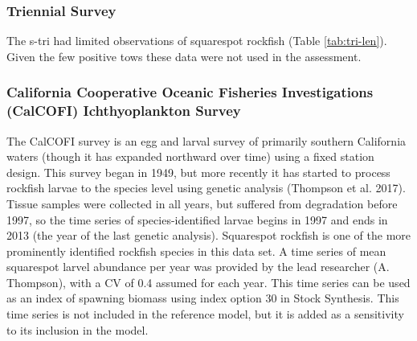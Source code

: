 \documentclass[11pt,
  english,
  a4paper,
]{article}
\begin{document}
\leavevmode\tagmcend\tagstructend\par


\hypertarget{triennial-survey}{%
\subsubsection{Triennial Survey}\label{triennial-survey}}

\leavevmode\tagmcend\tagstructend


The \gls{s-tri} had limited observations of squarespot rockfish (Table \ref{tab:tri-len}). Given the few positive tows these data were not used in the assessment.

\leavevmode\tagmcend\tagstructend\par


\hypertarget{california-cooperative-oceanic-fisheries-investigations-calcofi-ichthyoplankton-survey}{%
\subsubsection{California Cooperative Oceanic Fisheries Investigations (CalCOFI) Ichthyoplankton Survey}\label{california-cooperative-oceanic-fisheries-investigations-calcofi-ichthyoplankton-survey}}

\leavevmode\tagmcend\tagstructend


The CalCOFI survey is an egg and larval survey of primarily southern California waters (though it has expanded northward over time) using a fixed station design. This survey began in 1949, but more recently it has started to process rockfish larvae to the species level using genetic analysis {(Thompson et al. 2017)\leavevmode\tagmcend\tagstructend}. Tissue samples were collected in all years, but suffered from degradation before 1997, so the time series of species-identified larvae begins in 1997 and ends in 2013 (the year of the last genetic analysis). Squarespot rockfish is one of the more prominently identified rockfish species in this data set. A time series of mean squarespot larvel abundance per year was provided by the lead researcher (A. Thompson), with a CV of 0.4 assumed for each year. This time series can be used as an index of spawning biomass using index option 30 in Stock Synthesis. This time series is not included in the reference model, but it is added as a sensitivity to its inclusion in the model.
\end{document}
